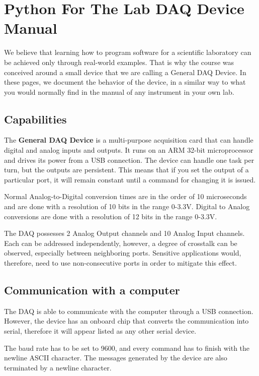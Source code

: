 \chapter{Python For The Lab {DAQ} Device Manual}\label{chapter:pftl-daq-manual}
We believe that learning how to program software for a scientific
laboratory can be achieved only through real-world examples. That is why
the course was conceived around a small device that we are calling a
General {DAQ} Device. In these pages, we document the behavior of the
device, in a similar way to what you would normally find in the manual
of any instrument in your own lab.

\section{Capabilities}\label{capabilities}
The \textbf{General {DAQ} Device} is a multi-purpose acquisition card
that can handle digital and analog inputs and outputs. It runs on an
{ARM} 32-bit microprocessor and drives its power from a {USB}
connection. The device can handle one task per turn, but the outputs are
persistent. This means that if you set the output of a particular port,
it will remain constant until a command for changing it is issued.

Normal Analog-to-Digital conversion times are in the order of 10
microseconds and are done with a resolution of 10 bits in the range
0-3.3V. Digital to Analog conversions are done with a resolution of 12
bits in the range 0-3.3V.

The {DAQ} possesses 2 Analog Output channels and 10 Analog Input
channels. Each can be addressed independently, however, a degree of
crosstalk can be observed, especially between neighboring ports.
Sensitive applications would, therefore, need to use non-consecutive
ports in order to mitigate this effect.

\section{Communication with a computer}\label{communication-with-acomputer}
The {DAQ} is able to communicate with the computer through a {USB}
connection. However, the device has an onboard chip that converts the
communication into serial, therefore it will appear listed as any other
serial device.

The baud rate has to be set to 9600, and every command has to finish
with the newline {ASCII} character. The messages generated by the device
are also terminated by a newline character.

